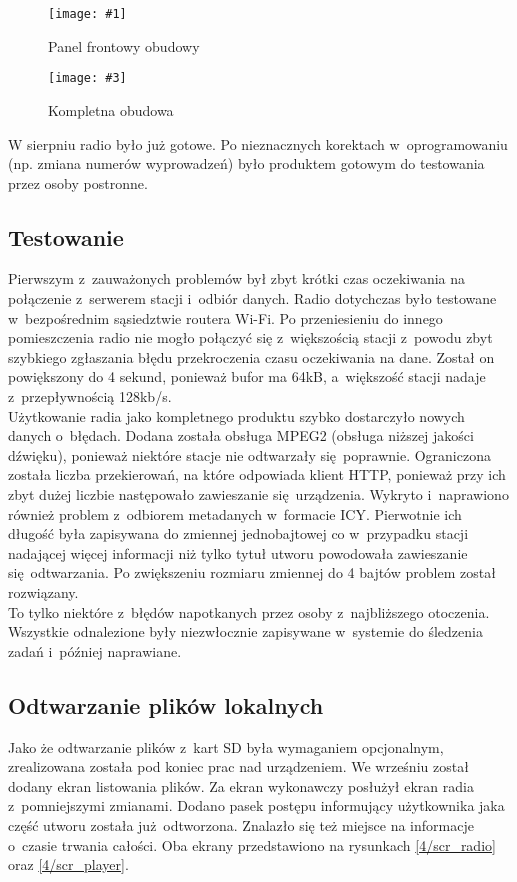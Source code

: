 \documentclass[polish]{aghengthesis}
\newcommand{\imgintss}[5]{
	\begin{figure}[{#5}]
		\centering
		\begin{minipage}{.45\textwidth}
			\centering
			\texttt{[image: \#1]}
			\caption{#2}
			\label{#1}
		\end{minipage}%
		\hfill
		\begin{minipage}{.45\textwidth}
			\centering
			\texttt{[image: \#3]}
			\caption{#4}
			\label{#3}
		\end{minipage}
	\end{figure}
}
\newcommand{\imghss}[4]{\imgintss{#1}{#2}{#3}{#4}{H}}
\begin{document}
			\imghss{4/case1}{Panel frontowy obudowy}{4/case2}{Kompletna obudowa}
			
			W sierpniu radio było już gotowe. Po nieznacznych korektach w~oprogramowaniu (np. zmiana numerów wyprowadzeń) było produktem gotowym do testowania przez osoby postronne.

		\subsection{Testowanie}
			Pierwszym z~zauważonych problemów był zbyt krótki czas oczekiwania na połączenie z~serwerem stacji i~odbiór danych. Radio dotychczas było testowane w~bezpośrednim sąsiedztwie routera Wi-Fi. Po przeniesieniu do innego pomieszczenia radio nie mogło połączyć się z~większością stacji z~powodu zbyt szybkiego zgłaszania błędu przekroczenia czasu oczekiwania na dane. Został on powiększony do 4 sekund, ponieważ bufor ma 64kB, a~większość stacji nadaje z~przepływnością 128kb/s.
			$ $\\
			
			Użytkowanie radia jako kompletnego produktu szybko dostarczyło nowych danych o~błędach. Dodana została obsługa MPEG2 (obsługa niższej jakości dźwięku), ponieważ niektóre stacje nie odtwarzały się poprawnie. Ograniczona została liczba przekierowań, na które odpowiada klient HTTP, ponieważ przy ich zbyt dużej liczbie następowało zawieszanie się urządzenia.
			Wykryto i~naprawiono również problem z~odbiorem metadanych w~formacie ICY. Pierwotnie ich długość była zapisywana do zmiennej jednobajtowej co w~przypadku stacji nadającej więcej informacji niż tylko tytuł utworu powodowała zawieszanie się odtwarzania. Po zwiększeniu rozmiaru zmiennej do 4 bajtów problem został rozwiązany.
			$ $\\
			
			To tylko niektóre z~błędów napotkanych przez osoby z~najbliższego otoczenia. Wszystkie odnalezione były niezwłocznie zapisywane w~systemie do śledzenia zadań i~później naprawiane.
			
		\subsection{Odtwarzanie plików lokalnych}
			Jako że odtwarzanie plików z~kart SD była wymaganiem opcjonalnym, zrealizowana została pod koniec prac nad urządzeniem. We wrześniu został dodany ekran listowania plików. Za ekran wykonawczy posłużył ekran radia z~pomniejszymi zmianami. Dodano pasek postępu informujący użytkownika jaka część utworu została już odtworzona. Znalazło się też miejsce na informacje o~czasie trwania całości. Oba ekrany przedstawiono na rysunkach \ref{4/scr_radio} oraz \ref{4/scr_player}.
			
\end{document}
